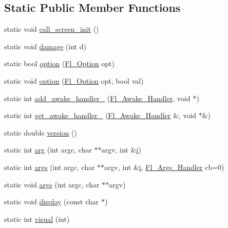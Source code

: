 \subsection*{Static Public Member Functions}
\begin{DoxyCompactItemize}
\item 
static void \hyperlink{class_fl_ae5d5f242d5b6b79b761c12ba02df28dd}{call\+\_\+screen\+\_\+init} ()
\item 
static void \hyperlink{class_fl_a45391ff5a25464a6e40658b58bf3ef98}{damage} (int d)
\item 
static bool \hyperlink{class_fl_a1f2a298d306f170fbb8d3caa7ebb079f}{option} (\hyperlink{class_fl_a43e6e0bbbc03cad134d928d4edd48d1d}{Fl\+\_\+\+Option} opt)
\item 
static void \hyperlink{class_fl_a3d05604368612a03f1a91d440f34ed11}{option} (\hyperlink{class_fl_a43e6e0bbbc03cad134d928d4edd48d1d}{Fl\+\_\+\+Option} opt, bool val)
\item 
static int \hyperlink{class_fl_a9d0ff41e9133d3ccdbbea4ddce82a80a}{add\+\_\+awake\+\_\+handler\+\_\+} (\hyperlink{group__callback__functions_ga28b44ff2052ca0b06d0da852fadd42c0}{Fl\+\_\+\+Awake\+\_\+\+Handler}, void $\ast$)
\item 
static int \hyperlink{class_fl_a1ebc15e089226ac9dc79e675efa27131}{get\+\_\+awake\+\_\+handler\+\_\+} (\hyperlink{group__callback__functions_ga28b44ff2052ca0b06d0da852fadd42c0}{Fl\+\_\+\+Awake\+\_\+\+Handler} \&, void $\ast$\&)
\item 
static double \hyperlink{class_fl_a691ce8682015fdbd38e49e9257316409}{version} ()
\item 
static int \hyperlink{class_fl_a746021246ddda071c5414064e536f988}{arg} (int argc, char $\ast$$\ast$argv, int \&\hyperlink{forms_8_h_acb559820d9ca11295b4500f179ef6392}{i})
\item 
static int \hyperlink{class_fl_a57d6ddce4c9669fef6b8973b5cc916bd}{args} (int argc, char $\ast$$\ast$argv, int \&\hyperlink{forms_8_h_acb559820d9ca11295b4500f179ef6392}{i}, \hyperlink{group__callback__functions_ga6cb5354ccaa2a6619f2408dbb5203f3b}{Fl\+\_\+\+Args\+\_\+\+Handler} cb=0)
\item 
static void \hyperlink{class_fl_a17680a4bde1157bdfc9df4d7fad24df6}{args} (int argc, char $\ast$$\ast$argv)
\item 
static void \hyperlink{class_fl_a8b086d663a79f110e056c13a0522dc31}{display} (const char $\ast$)
\item 
static int \hyperlink{class_fl_a96065665bab374bab4dc61bacccb40d8}{visual} (int)
$$
\end{DoxyCompactItemize}
